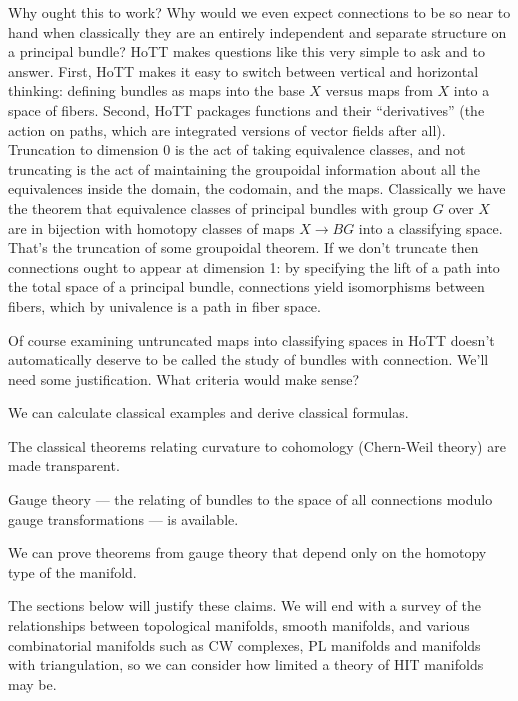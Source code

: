 \documentclass[12pt]{article}
\begin{document}
Why ought this to work? Why would we even expect connections to be so near to hand when classically they are an entirely independent and separate structure on a principal bundle? HoTT makes questions like this very simple to ask and to answer. First, HoTT makes it easy to switch between vertical and horizontal thinking: defining bundles as maps into the base \( X \) versus maps from \( X \) into a space of fibers. Second, HoTT packages functions and their ``derivatives'' (the action on paths, which are integrated versions of vector fields after all). Truncation to dimension 0 is the act of taking equivalence classes, and not truncating is the act of maintaining the groupoidal information about all the equivalences inside the domain, the codomain, and the maps. Classically we have the theorem that equivalence classes of principal bundles with group \( G \) over \( X \) are in bijection with homotopy classes of maps \( X\to BG \) into a classifying space. That's the truncation of some groupoidal theorem. If we don't truncate then connections ought to appear at dimension 1: by specifying the lift of a path into the total space of a principal bundle, connections yield isomorphisms between fibers, which by univalence is a path in fiber space.

Of course examining untruncated maps into classifying spaces in HoTT doesn't automatically deserve to be called the study of bundles with connection. We'll need some justification. What criteria would make sense?

\begin{myclaim}
We can calculate classical examples and derive classical formulas.
\end{myclaim}

\begin{myclaim}
The classical theorems relating curvature to cohomology (Chern-Weil theory) are made transparent.
\end{myclaim}

\begin{myclaim}
Gauge theory --- the relating of bundles to the space of all connections modulo gauge transformations --- is available.
\end{myclaim}

\begin{myclaim}
We can prove theorems from gauge theory that depend only on the homotopy type of the manifold.
\end{myclaim}

The sections below will justify these claims. We will end with a survey of the relationships between topological manifolds, smooth manifolds, and various combinatorial manifolds such as CW complexes, PL manifolds and manifolds with triangulation, so we can consider how limited a theory of HIT manifolds may be.
\end{document}

